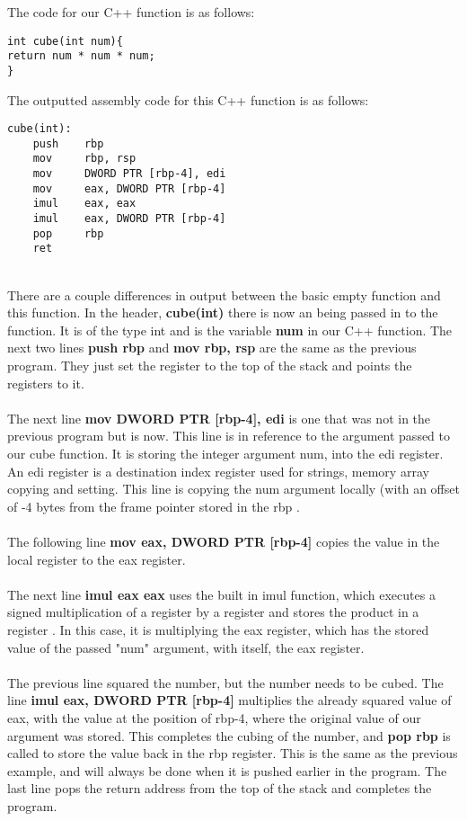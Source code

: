 \documentclass{article}
\theoremstyle{theorem}
\theoremstyle{definition}
\theoremstyle{remark}
\begin{document}
The code for our C++ function is as follows:
\begin{lstlisting}
int cube(int num){
return num * num * num;
}
\end{lstlisting}

The outputted assembly code for this C++ function is as follows:
\begin{lstlisting}
cube(int):
    push    rbp
    mov     rbp, rsp
    mov     DWORD PTR [rbp-4], edi
    mov     eax, DWORD PTR [rbp-4]
    imul    eax, eax
    imul    eax, DWORD PTR [rbp-4]
    pop     rbp
    ret
\end{lstlisting} \cite{GODBOLT}
\\
There are a couple differences in output between the basic empty function and this function. In the header, \textbf{cube(int)} there is now an being passed in to the function. It is of the type int and is the variable \textbf{num} in our C++ function. The next two lines \textbf{push rbp} and \textbf{mov rbp, rsp} are the same as the previous program. They just set the register to the top of the stack and points the registers to it.
\\
\\
The next line \textbf{mov DWORD PTR [rbp-4], edi} is one that was not in the previous program but is now. This line is in reference to the argument passed to our cube function. It is storing the integer argument num, into the edi register. An edi register is a destination index register used for strings, memory array copying and setting. This line is copying the num argument locally (with an offset of -4 bytes from the frame pointer stored in the rbp \cite{PTR}.
\\
\\
The following line \textbf{mov eax, DWORD PTR [rbp-4]} copies the value in the local register to the eax register.
\\
\\
The next line \textbf{imul eax eax} uses the built in imul function, which executes a signed multiplication of a register by a register and stores the product in a register \cite{IMUL}. In this case, it is multiplying the eax register, which has the stored value of the passed "num" argument, with itself, the eax register.
\\
\\
The previous line squared the number, but the number needs to be cubed. The line \textbf{imul eax, DWORD PTR [rbp-4]} multiplies the already squared value of eax, with the value at the position of rbp-4, where the original value of our argument was stored\cite{IMUL}. This completes the cubing of the number, and \textbf{pop rbp} is called to store the value back in the rbp register. This is the same as the previous example, and will always be done when it is pushed earlier in the program. The last line pops the return address from the top of the stack and completes the program.
\end{document}

